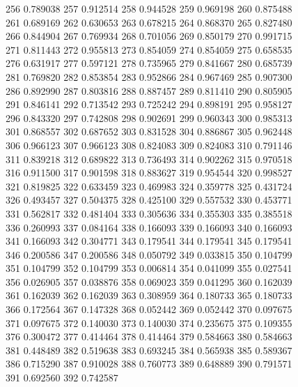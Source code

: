 \begin{figure}
{    256   0.789038
    257   0.912514
    258   0.944528
    259   0.969198
    260   0.875488
    261   0.689169
    262   0.630653
    263   0.678215
    264   0.868370
    265   0.827480
    266   0.844904
    267   0.769934
    268   0.701056
    269   0.850179
    270   0.991715
    271   0.811443
    272   0.955813
    273   0.854059
    274   0.854059
    275   0.658535
    276   0.631917
    277   0.597121
    278   0.735965
    279   0.841667
    280   0.685739
    281   0.769820
    282   0.853854
    283   0.952866
    284   0.967469
    285   0.907300
    286   0.892990
    287   0.803816
    288   0.887457
    289   0.811410
    290   0.805905
    291   0.846141
    292   0.713542
    293   0.725242
    294   0.898191
    295   0.958127
    296   0.843320
    297   0.742808
    298   0.902691
    299   0.960343
    300   0.985313
    301   0.868557
    302   0.687652
    303   0.831528
    304   0.886867
    305   0.962448
    306   0.966123
    307   0.966123
    308   0.824083
    309   0.824083
    310   0.791146
    311   0.839218
    312   0.689822
    313   0.736493
    314   0.902262
    315   0.970518
    316   0.911500
    317   0.901598
    318   0.883627
    319   0.954544
    320   0.998527
    321   0.819825
    322   0.633459
    323   0.469983
    324   0.359778
    325   0.431724
    326   0.493457
    327   0.504375
    328   0.425100
    329   0.557532
    330   0.453771
    331   0.562817
    332   0.481404
    333   0.305636
    334   0.355303
    335   0.385518
    336   0.260993
    337   0.084164
    338   0.166093
    339   0.166093
    340   0.166093
    341   0.166093
    342   0.304771
    343   0.179541
    344   0.179541
    345   0.179541
    346   0.200586
    347   0.200586
    348   0.050792
    349   0.033815
    350   0.104799
    351   0.104799
    352   0.104799
    353   0.006814
    354   0.041099
    355   0.027541
    356   0.026905
    357   0.038876
    358   0.069023
    359   0.041295
    360   0.162039
    361   0.162039
    362   0.162039
    363   0.308959
    364   0.180733
    365   0.180733
    366   0.172564
    367   0.147328
    368   0.052442
    369   0.052442
    370   0.097675
    371   0.097675
    372   0.140030
    373   0.140030
    374   0.235675
    375   0.109355
    376   0.300472
    377   0.414464
    378   0.414464
    379   0.584663
    380   0.584663
    381   0.448489
    382   0.519638
    383   0.693245
    384   0.565938
    385   0.589367
    386   0.715290
    387   0.910028
    388   0.760773
    389   0.648889
    390   0.791571
    391   0.692560
    392   0.742587
}
\end{figure}

